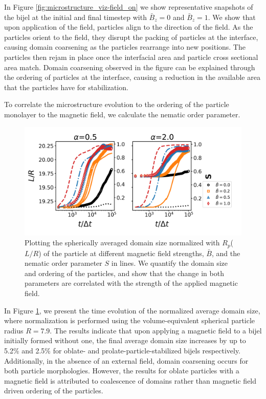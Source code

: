 In Figure \ref{fig:microstructure_viz-field_on} we show representative
snapshots of the bijel at the initial and final timestep with
\(\bar{B}_z = 0\) and \(\bar{B}_z = 1\). We show that upon application
of the field, particles align to the direction of the field. As the
particles orient to the field, they disrupt the packing of particles at
the interface, causing domain coarsening as the particles rearrange into
new positions. The particles then rejam in place once the interfacial
area and particle cross sectional area match. Domain coarsening observed
in the figure can be explained through the ordering of particles at the
interface, causing a reduction in the available area that the particles
have for stabilization.

To correlate the microstructure evolution to the ordering of the
particle monolayer to the magnetic field, we calculate the nematic order
parameter. \cite{veerman_phase_1992}

\begin{figure} 
\centering 
\includegraphics[scale=0.5]{../figures/results/paper2/domain_size-field_on.png} 
\caption{Plotting the spherically averaged domain size normalized with $R_p$($L/R$) of the particle at different magnetic field strengths, $\bar{B}$, and the nematic order parameter $S$ in lines. We quantify the domain size and ordering of the particles, and show that the change in both parameters are correlated with the strength of the applied magnetic field.} 
\label{fig:domain_size-field_on} 
\end{figure}

In Figure \ref{fig:domain_size-field_on}, we present the time evolution
of the normalized average domain size, where normalization is performed
using the volume-equivalent spherical particle radius \(R = 7.9\). The
results indicate that upon applying a magnetic field to a bijel
initially formed without one, the final average domain size increases by
up to 5.2\% and 2.5\% for oblate- and prolate-particle-stabilized bijels
respectively. Additionally, in the absence of an external field, domain
coarsening occurs for both particle morphologies. However, the results
for oblate particles with a magnetic field is attributed to coalescence
of domains rather than magnetic field driven ordering of the particles.


